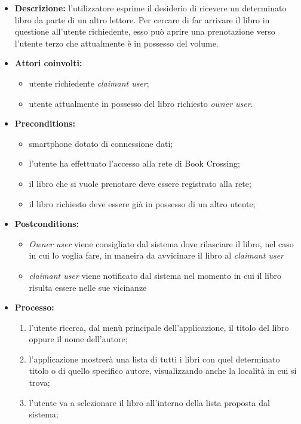 \begin{itemize}
	\begin{itemize}
		\item \textbf{Descrizione:} l'utilizzatore esprime il desiderio di ricevere un determinato libro da parte di un altro lettore. Per cercare di far arrivare il libro in questione all'utente richiedente, esso può aprire una prenotazione verso l'utente terzo che attualmente è in possesso del volume.
		\item \textbf{Attori coinvolti:} 
		\begin{itemize}
			\item utente richiedente \textit{claimant user};
			\item utente attualmente in possesso del libro richiesto \textit{owner user}.
		\end{itemize}
		\item \textbf{Preconditions:}
		\begin{itemize}
			\item smartphone dotato di connessione dati;
			\item l’utente ha effettuato l’accesso alla rete di Book Crossing;
			\item il libro che si vuole prenotare deve essere registrato alla rete;
			\item il libro richiesto deve essere già in possesso di un altro utente;
		\end{itemize}
		\item \textbf{Postconditions:}
		\begin{itemize}
			\item \textit{Owner user} viene consigliato dal sistema dove rilasciare il libro, nel caso in cui lo voglia fare, in maneira da avvicinare il libro al \textit{claimant user}
			\item \textit{claimant user} viene notificato dal sistema nel momento in cui il libro risulta essere nelle sue vicinanze
		\end{itemize}
		\item \textbf{Processo:}
		\begin{enumerate}
			\item l'utente ricerca, dal menù principale dell'applicazione, il titolo del libro oppure il nome dell'autore;
			\item l'applicazione mostrerà una lista di tutti i libri con quel determinato titolo o di quello specifico autore, visualizzando anche la località in cui si trova;
			\item l'utente va a selezionare il libro all'interno della lista proposta dal sistema;

\end{enumerate}
\end{itemize}
\end{itemize}

